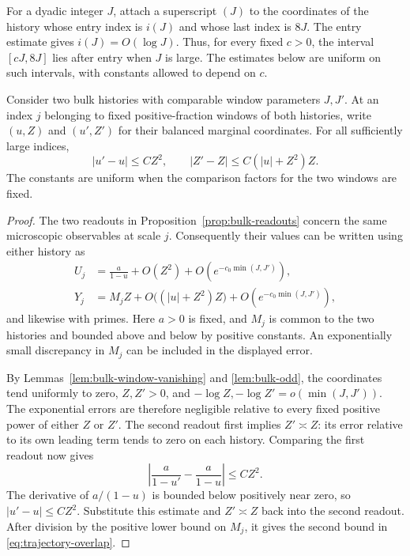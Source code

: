 For a dyadic integer $J$, attach a superscript $(J)$ to the
coordinates of the history whose entry index is $i(J)$ and whose
last index is $8J$.  The entry estimate gives $i(J)=O(\log J)$.
Thus, for every fixed $c>0$, the interval $[cJ,8J]$ lies after entry
when $J$ is large.  The estimates below are uniform on such intervals,
with constants allowed to depend on $c$.

\begin{lemma}
\label{lem:trajectory-overlap}
Consider two bulk histories with comparable window parameters $J,J'$.
At an index $j$ belonging to fixed positive-fraction windows of both
histories, write $(u,Z)$ and $(u',Z')$ for their balanced marginal
coordinates.  For all sufficiently large indices,
\begin{equation}
 |u'-u|\le CZ^2,
 \qquad
 |Z'-Z|\le C(|u|+Z^2)Z.
 \label{eq:trajectory-overlap}
\end{equation}
The constants are uniform when the comparison factors for the two
windows are fixed.
\end{lemma}

\begin{proof}
The two readouts in Proposition~\ref{prop:bulk-readouts} concern the
same microscopic observables at scale $j$.  Consequently their values
can be written using either history as
\begin{align*}
 U_j&=\frac a{1-u}+O(Z^2)+O(e^{-c_0\min(J,J')}),\\
 Y_j&=M_jZ+O\bigl((|u|+Z^2)Z\bigr)
                   +O(e^{-c_0\min(J,J')}),
\end{align*}
and likewise with primes.  Here $a>0$ is fixed, and $M_j$ is common
to the two histories and bounded above and below by positive
constants.  An exponentially small discrepancy in $M_j$ can be
included in the displayed error.

By Lemmas~\ref{lem:bulk-window-vanishing} and
\ref{lem:bulk-odd}, the coordinates tend uniformly to zero,
$Z,Z'>0$, and $-\log Z,-\log Z'=o(\min(J,J'))$.  The exponential
errors are therefore negligible relative to every fixed positive
power of either $Z$ or $Z'$.  The second readout first implies
$Z'\asymp Z$: its error relative to its own leading term tends to
zero on each history.  Comparing the first readout now gives
\[
 \left|\frac a{1-u'}-\frac a{1-u}\right|\le CZ^2.
\]
The derivative of $a/(1-u)$ is bounded below positively near zero,
so $|u'-u|\le CZ^2$.  Substitute this estimate and $Z'\asymp Z$
back into the second readout.  After division by the positive lower
bound on $M_j$, it gives the second bound in
\eqref{eq:trajectory-overlap}.
\end{proof}

